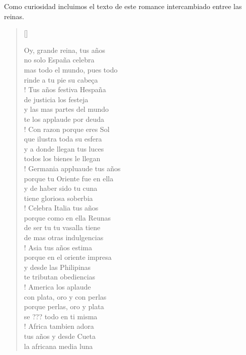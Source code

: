 Como curiosidad incluimos el texto de este romance intercambiado entree las reinas.



\begin{multicols}{3}
\fontsize{9.2pt}{10pt}\selectfont
\raggedcolumns

\settowidth{\versewidth}{xxxxxxxxxxxxxxxxxxxxxxxxxxxxxxxxx}
\begin{verse}[\versewidth]
\begin{altverse}
Oy, grande reina, tus años \\
no solo España celebra \\
mas todo el mundo, pues todo \\
rinde a tu pie su cabeça \\!
Tus años festiva Hespaña \\
de justicia los festeja \\
y las mas partes del mundo \\
te los applaude por deuda \\!
Con razon porque eres Sol \\
que ilustra toda su esfera \\
y a donde llegan tus luces \\
todos los bienes le llegan \\!
Germania appluaude tus años \\
porque tu Oriente fue en ella \\
y de haber sido tu cuna \\
tiene gloriosa soberbia \\!
Celebra Italia tus años \\
porque como en ella Reunas \\
de ser tu tu vasalla tiene \\
de mas otras indulgencias \\!
Asia tus años estima \\
porque en el oriente impresa \\
y desde las Philipinas \\
te tributan obediencias \\!
America los aplaude \\
con plata, oro y con perlas \\
porque perlas, oro y plata \\
se ??? todo en ti misma \\!
Africa tambien adora \\
tus años y desde Cueta \\
la africana media luna \\

\end{altverse}
\end{verse}
\end{multicols}
